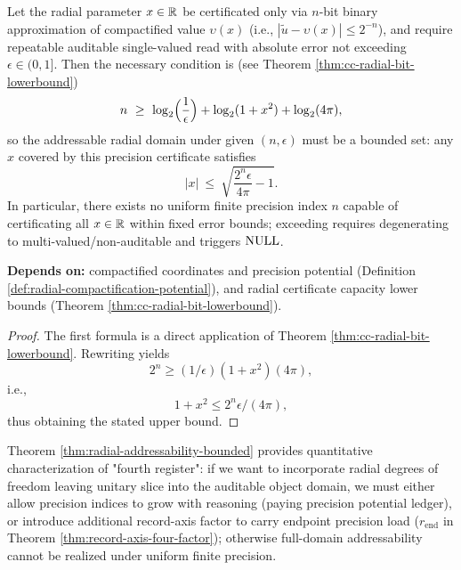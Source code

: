 \begin{theorem}\label{thm:radial-addressability-bounded}
Let the radial parameter $x\in\mathbb{R}$ be certificated only via $n$-bit binary approximation of compactified value $\upsilon(x)$ (i.e., $|\tilde u-\upsilon(x)|\le 2^{-n}$), and require repeatable auditable single-valued read with absolute error not exceeding $\epsilon\in(0,1]$. Then the necessary condition is (see Theorem \ref{thm:cc-radial-bit-lowerbound})
$$
n\ \ge\ \log_2\Bigl(\frac{1}{\epsilon}\Bigr)+\log_2(1+x^2)+\log_2(4\pi),
$$
so the addressable radial domain under given $(n,\epsilon)$ must be a bounded set: any $x$ covered by this precision certificate satisfies
$$
|x|\ \le\ \sqrt{\frac{2^{n}\epsilon}{4\pi}-1}.
$$
In particular, there exists no uniform finite precision index $n$ capable of certificating all $x\in\mathbb{R}$ within fixed error bounds; exceeding requires degenerating to multi-valued/non-auditable and triggers $\mathrm{NULL}$.\par
\noindent\textnormal{\textbf{Depends on:} compactified coordinates and precision potential (Definition \ref{def:radial-compactification-potential}), and radial certificate capacity lower bounds (Theorem \ref{thm:cc-radial-bit-lowerbound}).}\par
\end{theorem}

\begin{proof}
The first formula is a direct application of Theorem \ref{thm:cc-radial-bit-lowerbound}. Rewriting yields
$$
2^n \ge (1/\epsilon)(1+x^2)(4\pi),
$$
i.e.,
$$
1+x^2\le 2^n\epsilon/(4\pi),
$$
thus obtaining the stated upper bound.\par
\end{proof}

\begin{remark}
Theorem \ref{thm:radial-addressability-bounded} provides quantitative characterization of "fourth register": if we want to incorporate radial degrees of freedom leaving unitary slice into the auditable object domain, we must either allow precision indices to grow with reasoning (paying precision potential ledger), or introduce additional record-axis factor to carry endpoint precision load ($r_{\mathrm{end}}$ in Theorem \ref{thm:record-axis-four-factor}); otherwise full-domain addressability cannot be realized under uniform finite precision.\par
\end{remark}

